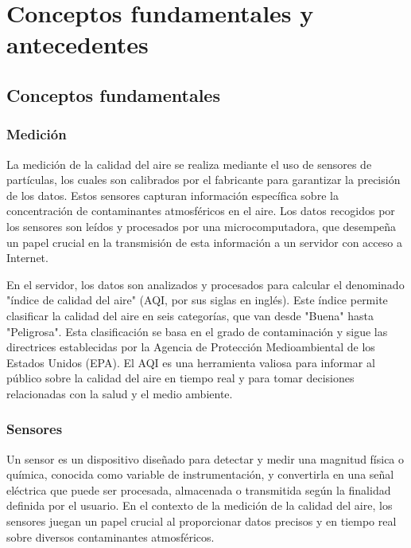 \fancyhead{}
\fancyfoot{}
\newtheorem{teorema}{Teorema}
\cfoot{\thepage}


\chapter{Conceptos fundamentales y antecedentes}
\section{Conceptos fundamentales}

\subsection{Medición}
La medición de la calidad del aire se realiza mediante el uso de sensores de partículas, los cuales son calibrados por el fabricante para garantizar la precisión de los datos. Estos sensores capturan información específica sobre la concentración de contaminantes atmosféricos en el aire. Los datos recogidos por los sensores son leídos y procesados por una microcomputadora, que desempeña un papel crucial en la transmisión de esta información a un servidor con acceso a Internet.

En el servidor, los datos son analizados y procesados para calcular el denominado "índice de calidad del aire" (AQI, por sus siglas en inglés). Este índice permite clasificar la calidad del aire en seis categorías, que van desde "Buena" hasta "Peligrosa". Esta clasificación se basa en el grado de contaminación y sigue las directrices establecidas por la Agencia de Protección Medioambiental de los Estados Unidos (EPA). El AQI es una herramienta valiosa para informar al público sobre la calidad del aire en tiempo real y para tomar decisiones relacionadas con la salud y el medio ambiente.

\subsection{Sensores}

Un sensor es un dispositivo diseñado para detectar y medir una magnitud física o química, conocida como variable de instrumentación, y convertirla en una señal eléctrica que puede ser procesada, almacenada o transmitida según la finalidad definida por el usuario. En el contexto de la medición de la calidad del aire, los sensores juegan un papel crucial al proporcionar datos precisos y en tiempo real sobre diversos contaminantes atmosféricos.


